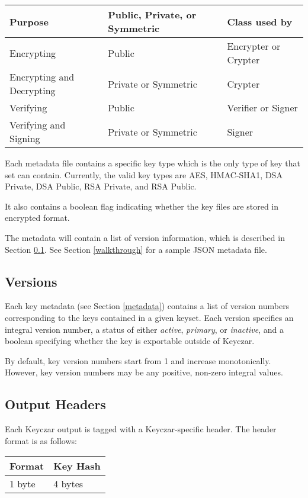 \documentclass{llncs}
\begin{document}
\vspace*{3mm}
\begin{tabular}{ l | l | l }
{\bf Purpose} &  {\bf Public, Private, or Symmetric } & {\bf Class used by} \\
\hline Encrypting & Public & Encrypter or Crypter \\ \hline
Encrypting and Decrypting & Private or Symmetric & Crypter \\ \hline
Verifying & Public & Verifier or Signer \\ \hline
Verifying and Signing & Private or Symmetric & Signer \\ \hline
\end{tabular}
\vspace*{3mm}

Each metadata file contains a specific key type which is the only type of key
that set can contain. Currently, the valid key types are AES, HMAC-SHA1, DSA
Private, DSA Public, RSA Private, and RSA Public.

It also contains a boolean flag indicating whether the key files are stored in
encrypted format.

The metadata will contain a list of version information, which is
described in Section \ref{versions}. See Section \ref{walkthrough} for a sample
JSON metadata file.

\subsection{Versions}\label{versions}

Each key metadata (see Section \ref{metadata}) contains a list of version
numbers corresponding to the keys contained in a given keyset. Each version
specifies an integral version number, a status of either {\it active}, {\it
primary}, or {\it inactive}, and a boolean specifying whether
the key is exportable outside of Keyczar.

By default, key version numbers start from 1 and increase monotonically.
However, key version numbers may be any positive, non-zero integral values.

\subsection{Output Headers} \label{header}

Each Keyczar output is tagged with a Keyczar-specific header. The header format
is as follows:

\vspace*{3mm}
\begin{tabular}{| l | l |}
\hline
Format & Key Hash \\ \hline
1 byte & 4 bytes \\ \hline
\end{tabular}
\vspace*{3mm}
\end{document}
